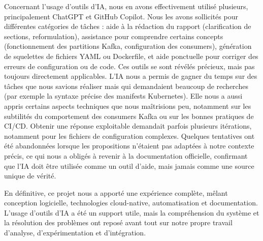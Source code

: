 \documentclass[10pt,a4paper]{article}
\begin{document}
Concernant l’usage d’outils d’IA, nous en avons effectivement utilisé plusieurs, principalement ChatGPT et GitHub Copilot. Nous les avons sollicités pour différentes catégories de tâches : aide à la rédaction du rapport (clarification de sections, reformulation), assistance pour comprendre certains concepts (fonctionnement des partitions Kafka, configuration des consumers), génération de squelettes de fichiers YAML ou Dockerfile, et aide ponctuelle pour corriger des erreurs de configuration ou de code.
Ces outils se sont révélés précieux, mais pas toujours directement applicables. L’IA nous a permis de gagner du temps sur des tâches que nous savions réaliser mais qui demandaient beaucoup de recherches (par exemple la syntaxe précise des manifests Kubernetes). Elle nous a aussi appris certains aspects techniques que nous maîtrisions peu, notamment sur les subtilités du comportement des consumers Kafka ou sur les bonnes pratiques de CI/CD.
Obtenir une réponse exploitable demandait parfois plusieurs itérations, notamment pour les fichiers de configuration complexes. Quelques tentatives ont été abandonnées lorsque les propositions n’étaient pas adaptées à notre contexte précis, ce qui nous a obligés à revenir à la documentation officielle, confirmant que l’IA doit être utilisée comme un outil d’aide, mais jamais comme une source unique de vérité.

En définitive, ce projet nous a apporté une expérience complète, mêlant conception logicielle, technologies cloud-native, automatisation et documentation. L’usage d’outils d’IA a été un support utile, mais la compréhension du système et la résolution des problèmes ont reposé avant tout sur notre propre travail d’analyse, d’expérimentation et d’intégration.
\end{document}
